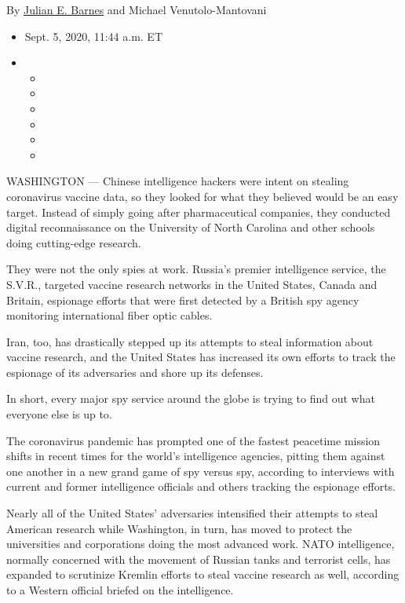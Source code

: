 By \href{https://www.nytimes3xbfgragh.onion/by/julian-e-barnes}{Julian
E. Barnes} and Michael Venutolo-Mantovani

\begin{itemize}
\item
  Sept. 5, 2020, 11:44 a.m. ET
\item
  \begin{itemize}
  \item
  \item
  \item
  \item
  \item
  \item
  \end{itemize}
\end{itemize}

WASHINGTON --- Chinese intelligence hackers were intent on stealing
coronavirus vaccine data, so they looked for what they believed would be
an easy target. Instead of simply going after pharmaceutical companies,
they conducted digital reconnaissance on the University of North
Carolina and other schools doing cutting-edge research.

They were not the only spies at work. Russia's premier intelligence
service, the S.V.R., targeted vaccine research networks in the United
States, Canada and Britain, espionage efforts that were first detected
by a British spy agency monitoring international fiber optic cables.

Iran, too, has drastically stepped up its attempts to steal information
about vaccine research, and the United States has increased its own
efforts to track the espionage of its adversaries and shore up its
defenses.

In short, every major spy service around the globe is trying to find out
what everyone else is up to.

The coronavirus pandemic has prompted one of the fastest peacetime
mission shifts in recent times for the world's intelligence agencies,
pitting them against one another in a new grand game of spy versus spy,
according to interviews with current and former intelligence officials
and others tracking the espionage efforts.

Nearly all of the United States' adversaries intensified their attempts
to steal American research while Washington, in turn, has moved to
protect the universities and corporations doing the most advanced work.
NATO intelligence, normally concerned with the movement of Russian tanks
and terrorist cells, has expanded to scrutinize Kremlin efforts to steal
vaccine research as well, according to a Western official briefed on the
intelligence.


